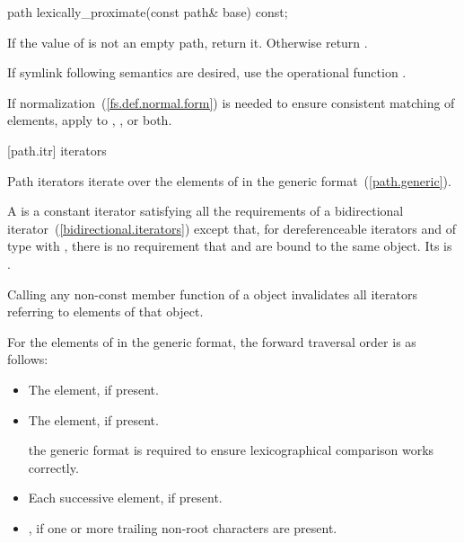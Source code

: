 %
\begin{itemdecl}
path lexically_proximate(const path& base) const;
\end{itemdecl}

\begin{itemdescr}
\pnum
\returns If the value of  is not an empty path,
  return it. Otherwise return .

\begin{note} If symlink following semantics are desired,
  use the operational function . \end{note}

\begin{note} If normalization~(\ref{fs.def.normal.form}) is needed
  to ensure consistent matching of elements,
  apply  to
  , , or both. \end{note}
\end{itemdescr}

[path.itr]{ iterators}

%
\pnum
Path iterators iterate over the elements of 
in the generic format~(\ref{path.generic}).

\pnum
A  is a constant iterator satisfying all the
requirements of a bidirectional iterator~(\ref{bidirectional.iterators})
except that,
for dereferenceable iterators  and 
of type 
with ,
there is no requirement that  and 
are bound to the same object.
Its  is .

\pnum
Calling any non-const member function of a  object
invalidates all iterators referring to elements of that object.

\pnum
For the elements of  in the generic format,
the forward traversal order is as follows:
\begin{itemize}
\item The  element, if present.
\item The  element, if present.
\begin{note}
the generic format is required to ensure lexicographical
comparison works correctly. \end{note}
\item Each successive  element, if present.
\item {}, if one or more trailing non-root 
characters are present.
\end{itemize}

